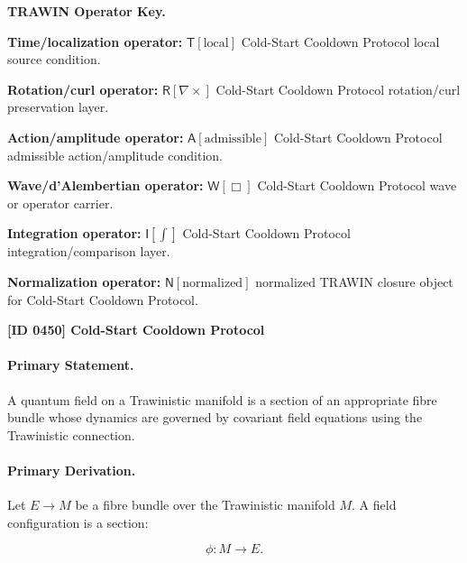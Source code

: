\par\vspace{0.45\baselineskip}
\noindent\begin{minipage}[t]{\linewidth}
\begingroup
\small
\raggedright
\textbf{TRAWIN Operator Key.}\par
\noindent\textbf{Time/localization operator:} $\mathsf{T}\!\left[\mathrm{local}\right]$ Cold-Start Cooldown Protocol local source condition.\par
\noindent\textbf{Rotation/curl operator:} $\mathsf{R}\!\left[\nabla\times\right]$ Cold-Start Cooldown Protocol rotation/curl preservation layer.\par
\noindent\textbf{Action/amplitude operator:} $\mathsf{A}\!\left[\mathrm{admissible}\right]$ Cold-Start Cooldown Protocol admissible action/amplitude condition.\par
\noindent\textbf{Wave/d'Alembertian operator:} $\mathsf{W}\!\left[\Box\right]$ Cold-Start Cooldown Protocol wave or operator carrier.\par
\noindent\textbf{Integration operator:} $\mathsf{I}\!\left[\int\right]$ Cold-Start Cooldown Protocol integration/comparison layer.\par
\noindent\textbf{Normalization operator:} $\mathsf{N}\!\left[\mathrm{normalized}\right]$ normalized TRAWIN closure object for Cold-Start Cooldown Protocol.\par
\endgroup
\end{minipage}

\clearpage
\noindent\textbf{[ID 0450] Cold-Start Cooldown Protocol}\par
\vspace{0.35em}
\paragraph{Primary Statement.}
A quantum field on a Trawinistic manifold is a section of an appropriate fibre bundle whose dynamics are governed by covariant field equations using the Trawinistic connection.

\paragraph{Primary Derivation.}
Let $E\to M$ be a fibre bundle over the Trawinistic manifold $M$.  
A field configuration is a section:

\begin{equation}
\phi:M\to E .
\end{equation}

